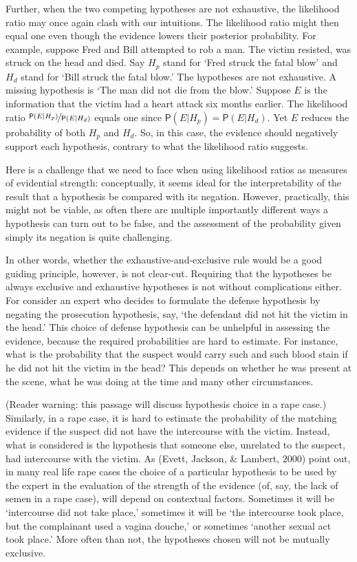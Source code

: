 \documentclass[
  10pt,
  dvipsnames,enabledeprecatedfontcommands]{scrartcl}
\newcommand{\mar}[1]{\todo[color=blue!40]{#1}}
\newcommand{\pr}[1]{\mathsf{P}(#1)}
\begin{document}
Further, when the two competing hypotheses are not exhaustive, the
likelihood ratio may once again clash with our intuitions. The
likelihood ratio might then equal one even though the evidence lowers
their posterior probability. For example, suppose Fred and Bill
attempted to rob a man. The victim resisted, was struck on the head and
died. Say \(H_p\) stand for `Fred struck the fatal blow' and \(H_d\)
stand for `Bill struck the fatal blow.' The hypotheses are not
exhaustive. A missing hypothesis is `The man did not die from the blow.'
Suppose \(E\) is the information that the victim had a heart attack six
months earlier. The likelihood ratio
\(\nicefrac{\pr{E \vert H_p}}{\pr{E \vert H_d}}\) equals one since
\(\pr{E\vert H_p}=\pr{E\vert H_d}\). Yet \(E\) reduces the probability
of both \(H_p\) and \(H_d\). So, in this case, the evidence should
negatively support each hypothesis, contrary to what the likelihood
ratio suggests.

\mar{R: added this passage in light of Sophie's comments}

Here is a challenge that we need to face when using likelihood ratios as
measures of evidential strength: conceptually, it seems ideal for the
interpretability of the result that a hypothesis be compared with its
negation. However, practically, this might not be viable, as often there
are multiple importantly different ways a hypothesis can turn out to be
false, and the assessment of the probability given simply its negation
is quite challenging.

In other words, whether the exhaustive-and-exclusive rule would be a
good guiding principle, however, is not clear-cut. Requiring that the
hypotheses be always exclusive and exhaustive hypotheses is not without
complications either. For consider an expert who decides to formulate
the defense hypothesis by negating the prosecution hypothesis, say, `the
defendant did not hit the victim in the head.' This choice of defense
hypothesis can be unhelpful in assessing the evidence, because the
required probabilities are hard to estimate. For instance, what is the
probability that the suspect would carry such and such blood stain if he
did not hit the victim in the head? This depends on whether he was
present at the scene, what he was doing at the time and many other
circumstances.

(Reader warning: this passage will discuss hypothesis choice in a rape
case.) Similarly, in a rape case, it is hard to estimate the probability
of the matching evidence if the suspect did not have the intercourse
with the victim. Instead, what is considered is the hypothesis that
someone else, unrelated to the suspect, had intercourse with the victim.
As (Evett, Jackson, \& Lambert, 2000) point out, in many real life rape
cases the choice of a particular hypothesis to be used by the expert in
the evaluation of the strength of the evidence (of, say, the lack of
semen in a rape case), will depend on contextual factors. Sometimes it
will be `intercourse did not take place,' sometimes it will be `the
intercourse took place, but the complainant used a vagina douche,' or
sometimes `another sexual act took place.' More often than not, the
hypotheses chosen will not be mutually exclusive.
\end{document}
